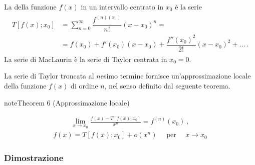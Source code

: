 \documentclass[letterpaper,10pt,english]{jupyterBook}
\begin{document}
\sphinxAtStartPar
La  della funzione \(f(x)\) in un intervallo centrato in \(x_0\) è la serie
\begin{equation*}
\begin{split}\begin{aligned}
  T[f(x); x_0] & = \sum_{n=0}^{\infty} \dfrac{f^{(n)(x_0)}}{n!} (x-x_0)^n = \\
       & = f(x_0) + f'(x_0) (x-x_0) + \dfrac{f''(x_0)^2}{2!} (x-x_0)^2 + \dots \ .
\end{aligned}\end{split}
\end{equation*}
\sphinxAtStartPar
La serie di MacLaurin è la serie di Taylor centrata in \(x_0 = 0\).

\sphinxAtStartPar
La serie di Taylor troncata al \(n\)\sphinxhyphen{}esimo termine fornisce un’approssimazione locale della funzione \(f(x)\) di ordine \(n\), nel senso definito dal seguente teorema.
\label{ch/infinitesimal_calculus/derivatives:theorem-5}
\begin{sphinxadmonition}{note}{Theorem 6 (Approssimazione locale)}


\begin{equation*}
\begin{split}\lim_{x \rightarrow x_0} \frac{f(x) - T[f(x); x_0]}{x^n} = f^{(n)}(x_0) \ , \end{split}
\end{equation*}\begin{equation*}
\begin{split}f(x) = T[f(x); x_0] + o(x^n) \quad \text{ per } \quad x \rightarrow x_0\end{split}
\end{equation*}\end{sphinxadmonition}
\subsubsection*{Dimostrazione}
\end{document}
